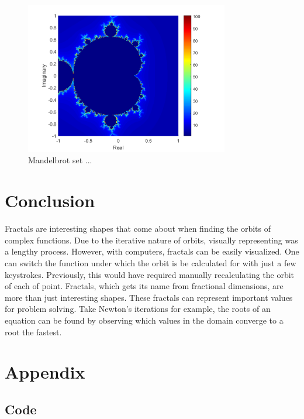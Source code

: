 \documentclass[letterpaper,11pt]{article}
\begin{document}
\begin{figure}
	\centering
	\includegraphics[width=3.5in]{../Figures/Mandelbrot.png}
	\caption{Mandelbrot set ...}
	\label{fig:Mandelbrot}
\end{figure}

\section{Conclusion}
Fractals are interesting shapes that come about when finding the orbits of complex functions. Due to the iterative nature of orbits, visually representing was a lengthy process. However, with computers, fractals can be easily visualized. One can switch the function under which the orbit is be calculated for with just a few keystrokes. Previously, this would have required manually recalculating the orbit of each of point. Fractals, which gets its name from fractional dimensions, are more than just interesting shapes. These fractals can represent important values for problem solving. Take Newton's iterations for example, the roots of an equation can be found by observing which values in the domain converge to a root the fastest. 

\newpage

\section{Appendix}

\subsection{Code}

\end{document}

